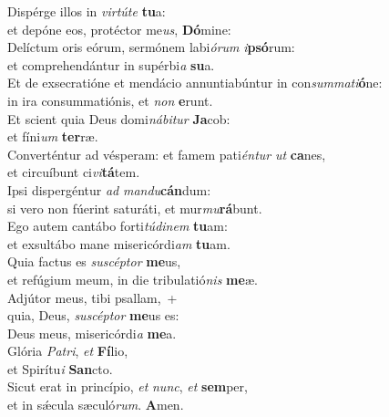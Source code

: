 \evenverse Dispérge illos in \textit{vir}\textit{tú}\textit{te} \textbf{tu}a:~\*\\
\evenverse et depóne eos, protéctor me\textit{us}, \textbf{Dó}mine:\\
\oddverse Delíctum oris eórum, sermónem labi\textit{ó}\textit{rum} \textit{i}\textbf{psó}rum:~\*\\
\oddverse et comprehendántur in supérbi\textit{a} \textbf{su}a.\\
\evenverse Et de exsecratióne et mendácio annuntiabúntur in con\textit{sum}\textit{ma}\textit{ti}\textbf{ó}ne:~\*\\
\evenverse in ira consummatiónis, et \textit{non} \textbf{e}runt.\\
\oddverse Et scient quia Deus domi\textit{ná}\textit{bi}\textit{tur} \textbf{Ja}cob:~\*\\
\oddverse et fíni\textit{um} \textbf{ter}ræ.\\
\evenverse Converténtur ad vésperam: et famem pati\textit{én}\textit{tur} \textit{ut} \textbf{ca}nes,~\*\\
\evenverse et circuíbunt ci\textit{vi}\textbf{tá}tem.\\
\oddverse Ipsi dispergéntur \textit{ad} \textit{man}\textit{du}\textbf{cán}dum:~\*\\
\oddverse si vero non fúerint saturáti, et mur\textit{mu}\textbf{rá}bunt.\\
\evenverse Ego autem cantábo forti\textit{tú}\textit{di}\textit{nem} \textbf{tu}am:~\*\\
\evenverse et exsultábo mane misericórdi\textit{am} \textbf{tu}am.\\
\oddverse Quia factus es \textit{su}\textit{scép}\textit{tor} \textbf{me}us,~\*\\
\oddverse et refúgium meum, in die tribulatió\textit{nis} \textbf{me}æ.\\
\evenverse Adjútor meus, tibi psallam,~+\\
\evenverse  quia, Deus, \textit{su}\textit{scép}\textit{tor} \textbf{me}us es:~\*\\
\evenverse Deus meus, misericórdi\textit{a} \textbf{me}a.\\
\oddverse Glória \textit{Pa}\textit{tri}, \textit{et} \textbf{Fí}lio,~\*\\
\oddverse et Spirítu\textit{i} \textbf{San}cto.\\
\evenverse Sicut erat in princípio, \textit{et} \textit{nunc}, \textit{et} \textbf{sem}per,~\*\\
\evenverse et in sǽcula sæculó\textit{rum}. \textbf{A}men.\\
